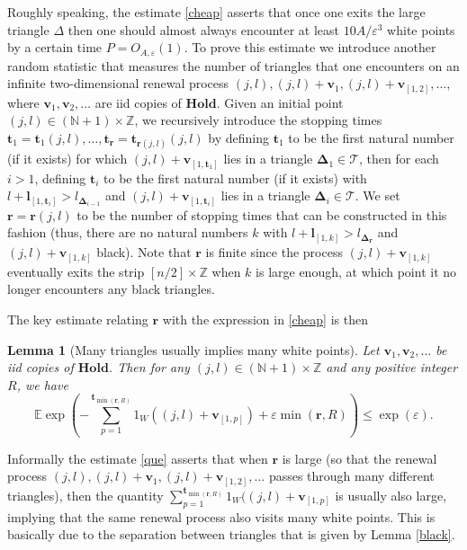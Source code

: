 \documentclass[12pt,a4paper,reqno]{amsart}
\numberwithin{equation}{section}
\theoremstyle{plain}
\newtheorem{lemma}[theorem]{Lemma}
\theoremstyle{definition}
\newcommand\E{\mathbb{E}}
\newcommand\Z{\mathbb{Z}}
\newcommand\N{\mathbb{N}}
\renewcommand\v{\mathbf{v}}
\renewcommand\t{\mathbf{t}}
\renewcommand\r{\mathbf{r}}
\renewcommand\l{\mathbf{l}}
\newcommand\Hold{\mathbf{Hold}}
\newcommand\eps{\varepsilon}
\begin{document}
Roughly speaking, the estimate \eqref{cheap} asserts that once one exits the large triangle $\Delta$ then one should almost always encounter at least $10A/\eps^3$ white points by a certain time $P = O_{A,\eps}(1)$.  To prove this estimate we introduce another random statistic that measures the number of triangles that one encounters on an infinite two-dimensional renewal process $(j,l), (j,l) + \v_1, (j,l) + \v_{[1,2]},\dots$, where $\v_1,\v_2,\dots$ are iid copies of $\Hold$.  Given an initial point $(j,l) \in (\N+1) \times \Z$, we recursively introduce the stopping times $\t_1 = \t_1(j,l),\dots,\t_\r = \t_{\r(j,l)}(j,l)$ by defining $\t_1$ to be the first natural number (if it exists) for which $(j,l) + \v_{[1,\t_1]}$ lies in a triangle $\mathbf{\Delta}_1 \in {\mathcal T}$, then for each $i>1$, defining $\t_i$ to be the first natural number (if it exists) with $l + \l_{[1,\t_i]} > l_{\mathbf{\Delta}_{i-1}}$ and $(j,l) + \v_{[1,\t_i]}$ lies in a triangle $\mathbf{\Delta}_i \in {\mathcal T}$.  We set $\r = \r(j,l)$ to be the number of stopping times that can be constructed in this fashion (thus, there are no natural numbers $k$ with $l + \l_{[1,k]} > l_{\mathbf{\Delta}_\r}$ and $(j,l) + \v_{[1,k]}$ black).  Note that $\r$ is finite since the process $(j,l)+\v_{[1,k]}$ eventually exits the strip $[n/2] \times \Z$ when $k$ is large enough, at which point it no longer encounters any black triangles.

The key estimate relating $\r$ with the expression in \eqref{cheap} is then

\begin{lemma}[Many triangles usually implies many white points]\label{rip}  Let $\v_1,\v_2,\dots$ be iid copies of $\Hold$.  Then for any $(j,l) \in (\N+1) \times \Z$ and any positive integer $R$, we have
\begin{equation}\label{que}
 \E \exp\left( - \sum_{p=1}^{\t_{\min(\r,R)}} 1_W((j,l) + \v_{[1,p]}) + \eps \min(\r,R) \right) \leq \exp(\eps).
\end{equation}
\end{lemma}

Informally the estimate \eqref{que} asserts that when $\r$ is large (so that the renewal process $(j,l), (j,l) + \v_1, (j,l) + \v_{[1,2]},\dots$ passes through many different triangles), then the quantity $\sum_{p=1}^{\t_{\min(\r,R)}} 1_W((j,l) + \v_{[1,p]}$ is usually also large, implying that the same renewal process also visits many white points.  This is basically due to the separation between triangles that is given by Lemma \ref{black}.
\end{document}
